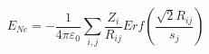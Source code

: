 \documentclass[12pt]{article}
\begin{document}
$$ 
E_{Ne}  =  - \frac{1}{{4\pi \varepsilon _0 }}\sum\limits_{i,j} {\frac{{Z_i }}{{R_{ij} }}Erf\left( {\frac{{\sqrt 2 R_{ij} }}{{s_j }}} \right)}
$$
\end{document}

